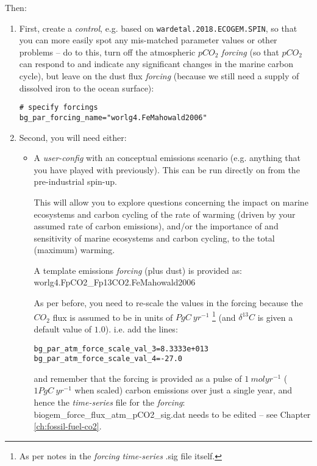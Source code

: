 \documentclass[11pt,fleqn]{book} %
\begin{document}
Then:

\begin{enumerate}[noitemsep]

\vspace{1mm}
\item First, create a \textit{control}, e.g. based on \texttt{wardetal.2018.ECOGEM.SPIN}, so that you can more easily spot any mis-matched parameter values or other problems -- do to this, turn off the atmospheric \(pCO_{2}\) \textit{forcing} (so that \(pCO_{2}\) can respond to and indicate any significant changes in the marine carbon cycle), but leave on the dust flux \textit{forcing} (because we still need a supply of dissolved iron to the ocean surface):
\vspace{-1mm}\small\begin{verbatim}
# specify forcings
bg_par_forcing_name="worlg4.FeMahowald2006"
\end{verbatim}\normalsize\vspace{-1mm}

\vspace{1mm}
\item Second, you will need either:

\vspace{1mm}
\begin{itemize}[noitemsep]
\item A \textit{user-config} with an conceptual emissions scenario (e.g. anything that you have played with previously). This can be run directly on from the pre-industrial spin-up.

This will allow you to explore questions concerning the impact on marine ecosystems and carbon cycling of the rate of warming (driven by your assumed rate of carbon emissions), and/or the importance of and sensitivity of marine ecosystems and carbon cycling, to the total (maximum) warming.

\vspace{1mm}
A template emissions \textit{forcing} (plus dust) is provided as:
\vspace{1mm}
\\\textsf{\footnotesize worlg4.FpCO2\_Fp13CO2.FeMahowald2006}

\vspace{1mm}
As per before, you need to re-scale the values in the forcing because the \(CO_{2}\) flux is assumed to be in units of \(PgC\:yr^{-1}\) \footnote{As per notes in the \textit{forcing} \textit{time-series} \textsf{\footnotesize .sig} file itself.} (and \(\delta^{13}C\) is given a default value of \(1.0\)). i.e. add the lines:
\vspace{-1mm}\small\begin{verbatim}
bg_par_atm_force_scale_val_3=8.3333e+013
bg_par_atm_force_scale_val_4=-27.0
\end{verbatim}\normalsize\vspace{-1mm}
and remember that the forcing is provided as a pulse of \(1\:molyr^{-1}\) (\(1PgC \:yr^{-1}\) when scaled) carbon emissions over just a single year, and hence the \textit{time-series} file for the \textit{forcing}: \textsf{\footnotesize biogem\_force\_flux\_atm\_pCO2\_sig.dat} needs to be edited -- see Chapter \ref{ch:fossil-fuel-co2}.


\end{itemize}
\end{enumerate}
\end{document}

